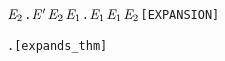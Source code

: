 \begin{alltt}
      \HOLSymConst{\HOLTokenForall{}}\ensuremath{\HOLBoundVar{E}\sb{\mathrm{2}}}. \ensuremath{\HOLBoundVar{E}\sp{\prime}} \HOLTokenTransBegin\HOLSymConst{\ensuremath{\tau}}\HOLTokenTransEnd \ensuremath{\HOLBoundVar{E}\sb{\mathrm{2}}} \HOLSymConst{\HOLTokenImp{}} \HOLSymConst{\HOLTokenExists{}}\ensuremath{\HOLBoundVar{E}\sb{\mathrm{1}}}.  \HOLTokenWeakTransBegin\HOLSymConst{\ensuremath{\tau}}\HOLTokenWeakTransEnd \ensuremath{\HOLBoundVar{E}\sb{\mathrm{1}}} \HOLSymConst{\HOLTokenConj{}}  \ensuremath{\HOLBoundVar{E}\sb{\mathrm{1}}} \ensuremath{\HOLBoundVar{E}\sb{\mathrm{2}}}\hfill{[EXPANSION]}

\HOLTokenTurnstile{}  \HOLSymConst{\HOLTokenExpands{}}  \HOLSymConst{\HOLTokenEquiv{}} \HOLSymConst{\HOLTokenExists{}}.    \HOLSymConst{\HOLTokenConj{}}  \hfill{[expands_thm]}
\end{alltt}

